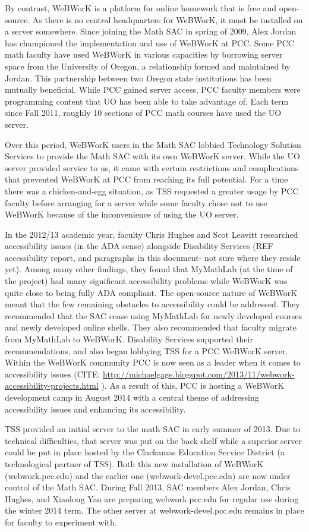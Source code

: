 By contrast, WeBWorK is a platform for online homework that is free and open-source. As there is no central headquarters for WeBWorK, it must be installed on a server somewhere. Since joining the Math SAC in spring of 2009, Alex Jordan has championed the implementation and use of WeBWorK at PCC. Some PCC math faculty have used WeBWorK in various capacities by borrowing server space from the University of Oregon, a relationship formed and maintained by Jordan. This partnership between two Oregon state institutions has been mutually beneficial. While PCC gained server access, PCC faculty members were programming content that UO has been able to take advantage of. Each term since Fall 2011, roughly 10 sections of PCC math courses have used the UO server.

Over this period, WeBWorK users in the Math SAC lobbied Technology Solution Services to provide the Math SAC with its own WeBWorK server. While the UO server provided service to us, it came with certain restrictions and complications that prevented WeBWorK at PCC from reaching its full potential. For a time there was a chicken-and-egg situation, as TSS requested a greater usage by PCC faculty before arranging for a server while some faculty chose not to use WeBWorK because of the inconvenience of using the UO server.

In the 2012/13 academic year, faculty Chris Hughes and Scot Leavitt researched accessibility issues (in the ADA sense) alongside Disability Services (REF accessibility report, and paragraphs in this document- not sure where they reside yet). Among many other findings, they found that MyMathLab (at the time of the project) had many significant accessibility problems while WeBWorK was quite close to being fully ADA compliant. The open-source nature of WeBWorK meant that the few remaining obstacles to accessibility could be addressed. They recommended that the SAC cease using MyMathLab for newly developed courses and newly developed online shells. They also recommended that faculty migrate from MyMathLab to WeBWorK. Disability Services supported their recommendations, and also began lobbying TSS for a PCC WeBWorK server. Within the WeBWorK community PCC is now seen as a leader when it comes to accessibility issues (CITE: \url{http://michaelgage.blogspot.com/2013/11/webwork-accessibility-projects.html} ). As a result of this, PCC is hosting a WeBWorK development camp in August 2014 with a central theme of addressing accessibility issues and enhancing its accessibility.

TSS provided an initial server to the math SAC in early summer of 2013. Due to technical difficulties, that server was put on the back shelf while a superior server could be put in place hosted by the Clackamas Education Service District (a technological partner of TSS). Both this new installation of WeBWorK (webwork.pcc.edu) and the earlier one (webwork-devel.pcc.edu) are now under control of the Math SAC. During Fall 2013, SAC members Alex Jordan, Chris Hughes, and Xiaolong Yao are preparing webwork.pcc.edu for regular use during the winter 2014 term. The other server at webwork-devel.pcc.edu remains in place for faculty to experiment with.

